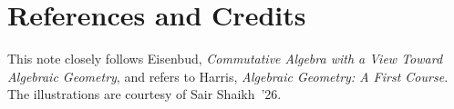 \documentclass[12pt]{amsproc}
\begin{document}



\section*{References and Credits}
This note closely follows Eisenbud, \emph{Commutative Algebra with a View 
Toward Algebraic Geometry}, and refers to Harris, \emph{Algebraic 
Geometry: A First Course}. The illustrations are courtesy of Sair 
Shaikh~'26.



\end{document}
